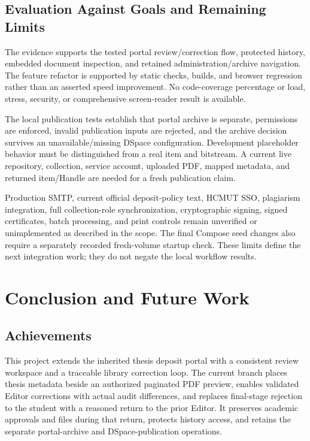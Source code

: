 \documentclass[11pt,a4paper]{report}
\begin{document}
\section{Evaluation Against Goals and Remaining Limits}
The evidence supports the tested portal review/correction flow, protected history, embedded document inspection, and retained administration/archive navigation. The feature refactor is supported by static checks, builds, and browser regression rather than an asserted speed improvement. No code-coverage percentage or load, stress, security, or comprehensive screen-reader result is available.

The local publication tests establish that portal archive is separate, permissions are enforced, invalid publication inputs are rejected, and the archive decision survives an unavailable/missing DSpace configuration. Development placeholder behavior must be distinguished from a real item and bitstream. A current live repository, collection, service account, uploaded PDF, mapped metadata, and returned item/Handle are needed for a fresh publication claim.

Production SMTP, current official deposit-policy text, HCMUT SSO, plagiarism integration, full collection-role synchronization, cryptographic signing, signed certificates, batch processing, and print controls remain unverified or unimplemented as described in the scope. The final Compose seed changes also require a separately recorded fresh-volume startup check. These limits define the next integration work; they do not negate the local workflow results.

\chapter{Conclusion and Future Work}

\section{Achievements}
This project extends the inherited thesis deposit portal with a consistent review workspace and a traceable library correction loop. The current branch places thesis metadata beside an authorized paginated PDF preview, enables validated Editor corrections with actual audit differences, and replaces final-stage rejection to the student with a reasoned return to the prior Editor. It preserves academic approvals and files during that return, protects history access, and retains the separate portal-archive and DSpace-publication operations.
\end{document}
